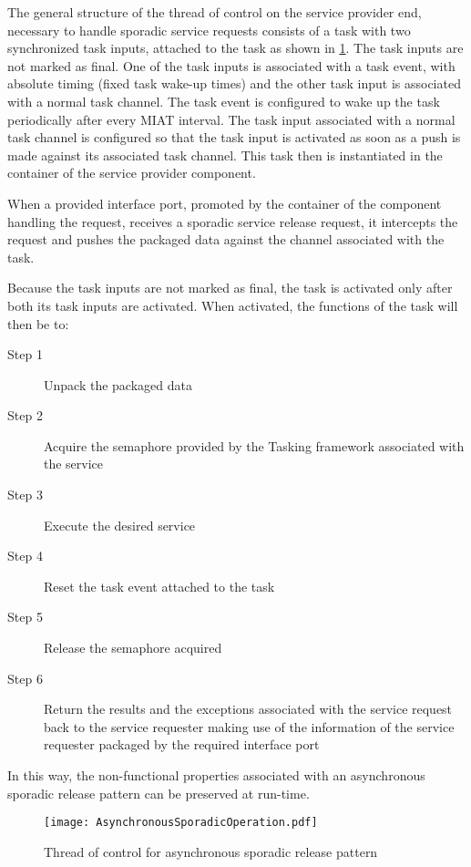 The general structure of the thread of control on the service provider end, necessary to handle sporadic service requests consists of a task with two synchronized task inputs, attached to the task as shown in \cref{fig: Asynchronous sporadic}. The task inputs are not marked as final. One of the task inputs is associated with a task event, with absolute timing (fixed task wake-up times) and the other task input is associated with a normal task channel. The task event is configured to wake up the task periodically after every MIAT interval. The task input associated with a normal task channel is configured so that the task input is activated as soon as a push is made against its associated task channel. This task then is instantiated in the container of the service provider component.   

When a provided interface port, promoted by the container of the component handling the request, receives a sporadic service release request, it intercepts the request and pushes the packaged data against the channel associated with the task. 

Because the task inputs are not marked as final, the task is activated only after both its task inputs are activated. When activated, the functions of the task will then be to:
 
\begin{description}
\item [Step 1] Unpack the packaged data
\item [Step 2] Acquire the semaphore provided by the Tasking framework associated with the service
\item [Step 3] Execute the desired service
\item [Step 4] Reset the task event attached to the task
\item [Step 5] Release the semaphore acquired 
\item [Step 6] Return the results and the exceptions associated with the service request back to the service requester making use of the information of the service requester packaged by the required interface port 
\end{description}

In this way, the non-functional properties associated with an asynchronous sporadic release pattern can be preserved at run-time.

\begin{figure}[h]
	\centering
	\texttt{[image: AsynchronousSporadicOperation.pdf]}
	\caption{Thread of control for asynchronous sporadic release pattern}
	\label{fig: Asynchronous sporadic}
\end{figure}

